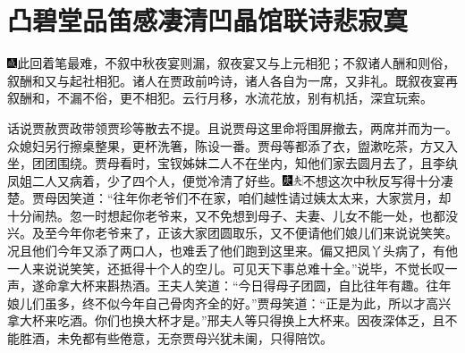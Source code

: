 \chapter{凸碧堂品笛感凄清\hspace{.5em}凹晶馆联诗悲寂寞}

{\includegraphics[width=3mm]{../Images/00005}\kaishu 此回着笔最难，不叙中秋夜宴则漏，叙夜宴又与上元相犯；不叙诸人酬和则俗，叙酬和又与起社相犯。诸人在贾政前吟诗，诸人各自为一席，又非礼。既叙夜宴再叙酬和，不漏不俗，更不相犯。云行月移，水流花放，别有机括，深宜玩索。}

话说贾赦贾政带领贾珍等散去不提。且说贾母这里命将围屏撤去，两席并而为一。众媳妇另行擦桌整果，更杯洗箸，陈设一番。贾母等都添了衣，盥漱吃茶，方又入坐，团团围绕。贾母看时，宝钗姊妹二人不在坐内，知他们家去圆月去了，且李纨凤姐二人又病着，少了四个人，便觉冷清了好些。{\includegraphics[width=3mm]{../Images/00004}\includegraphics[width=3mm]{../Images/00012}\footnotesize \kaishu 不想这次中秋反写得十分凄楚。}贾母因笑道：“往年你老爷们不在家，咱们越性请过姨太太来，大家赏月，却十分闹热。忽一时想起你老爷来，又不免想到母子、夫妻、儿女不能一处，也都没兴。及至今年你老爷来了，正该大家团圆取乐，又不便请他们娘儿们来说说笑笑。况且他们今年又添了两口人，也难丢了他们跑到这里来。偏又把凤丫头病了，有他一人来说说笑笑，还抵得十个人的空儿。可见天下事总难十全。”说毕，不觉长叹一声，遂命拿大杯来斟热酒。王夫人笑道：“今日得母子团圆，自比往年有趣。往年娘儿们虽多，终不似今年自己骨肉齐全的好。”贾母笑道：“正是为此，所以才高兴拿大杯来吃酒。你们也换大杯才是。”邢夫人等只得换上大杯来。因夜深体乏，且不能胜酒，未免都有些倦意，无奈贾母兴犹未阑，只得陪饮。

